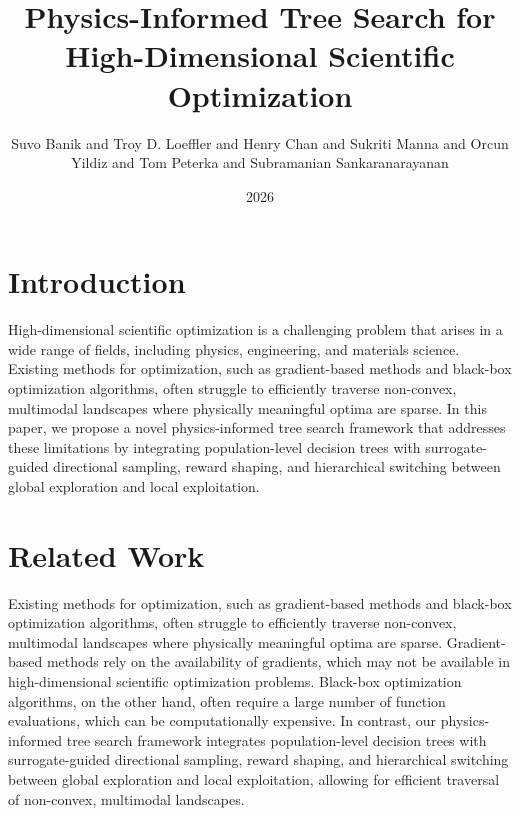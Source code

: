 \documentclass{article}
\begin{document}
\title{Physics-Informed Tree Search for High-Dimensional Scientific Optimization}

\author{Suvo Banik and Troy D. Loeffler and Henry Chan and Sukriti Manna and Orcun Yildiz and Tom Peterka and Subramanian Sankaranarayanan}

\date{2026}

\maketitle


\section{Introduction}

High-dimensional scientific optimization is a challenging problem that arises in a wide range of fields, including physics, engineering, and materials science. Existing methods for optimization, such as gradient-based methods and black-box optimization algorithms, often struggle to efficiently traverse non-convex, multimodal landscapes where physically meaningful optima are sparse. In this paper, we propose a novel physics-informed tree search framework that addresses these limitations by integrating population-level decision trees with surrogate-guided directional sampling, reward shaping, and hierarchical switching between global exploration and local exploitation.

\section{Related Work}

Existing methods for optimization, such as gradient-based methods and black-box optimization algorithms, often struggle to efficiently traverse non-convex, multimodal landscapes where physically meaningful optima are sparse. Gradient-based methods rely on the availability of gradients, which may not be available in high-dimensional scientific optimization problems. Black-box optimization algorithms, on the other hand, often require a large number of function evaluations, which can be computationally expensive. In contrast, our physics-informed tree search framework integrates population-level decision trees with surrogate-guided directional sampling, reward shaping, and hierarchical switching between global exploration and local exploitation, allowing for efficient traversal of non-convex, multimodal landscapes.
\end{document}
